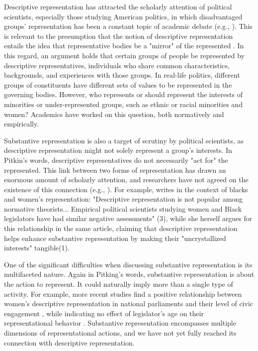 \documentclass[a4paper, 12pt]{article}\usepackage[dvipdfmx]{graphicx}\usepackage[]{xcolor}
\begin{document}
Descriptive representation has attracted the scholarly attention of political scientists, especially those studying American politics, in which disadvantaged groups' representation has been a constant topic of academic debate (e.g., \citet{mansbridge1999should, lemi2022descriptive}). This is relevant to the presumption that the notion of descriptive representation entails the idea that representative bodies be a "mirror" of the represented \citep{pitkin1967concept}. In this regard, an argument holds that certain groups of people be represented by descriptive representatives, individuals who share common characteristics, backgrounds, and experiences with those groups. In real-life politics, different groups of constituents have different sets of values to be represented in the governing bodies. However, who represents or should represent the interests of minorities or under-represented groups, such as ethnic or racial minorities and women? Academics have worked on this question, both normatively and empirically. 

Substantive representation is also a target of scrutiny by political scientists, as descriptive representation might not solely represent a group's interests. In Pitkin's words, descriptive representatives do not necessarily "act for" the represented. This link between two forms of representation has drawn an enormous amount of scholarly attention, and researchers have not agreed on the existence of this connection (e.g., \citet{mansbridge1999should, espirito2020does, wangnerud2009women}). For example, \citet{mansbridge1999should} writes in the context of blacks and women's representation: "Descriptive representation is not popular among normative theorists... Empirical political scientists studying women and Black legislators have had similar negative assessments" (3), while she herself argues for this relationship in the same article, claiming that descriptive representation helps enhance substantive representation by making their "uncrystallized interests" tangible(1). 

One of the significant difficulties when discussing substantive representation is its multifaceted nature. Again in Pitking's words, substantive representation is about the action to represent. It could naturally imply more than a single type of activity. For example, more recent studies find a positive relationship between women's descriptive representation in national parliaments and their level of civic engagement \citep{norris2009one}, while indicating no effect of legislator's age on their representational behavior \citep{tam2022does}. Substantive representation encompasses multiple dimensions of representational actions, and we have not yet fully reached its connection with descriptive representation. 
\end{document}
